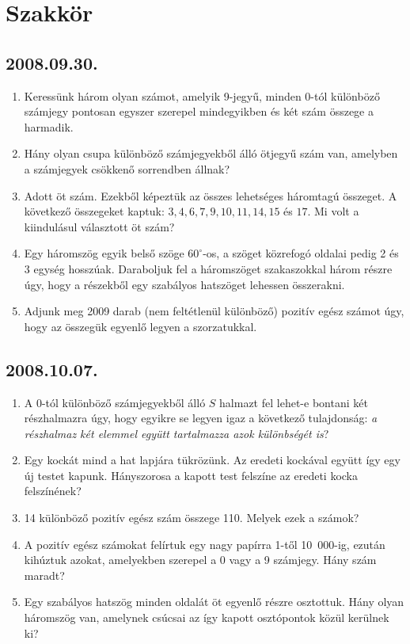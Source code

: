 \section{Szakkör}

\subsection*{2008.09.30.}
\begin{enumerate}
\item Keressünk három olyan számot, amelyik 9-jegyű, minden 0-tól különböző számjegy pontosan egyszer szerepel mindegyikben és két szám összege a harmadik.
\item Hány olyan csupa különböző számjegyekből álló ötjegyű szám van, amelyben a 
számjegyek csökkenő sorrendben állnak?
\item Adott öt szám. Ezekből képeztük az összes lehetséges háromtagú összeget. 
A következő összegeket kaptuk: $3,4,6,7,9,10,11,14,15$ és $17$. Mi volt a kiindulásul választott öt szám?
\item Egy háromszög egyik belső szöge $60^\circ$-os, a szöget közrefogó oldalai pedig 2 és 3 egység hosszúak. Daraboljuk fel a háromszöget szakaszokkal három részre úgy, hogy a részekből egy szabályos hatszöget lehessen össze\-rakni.
\item Adjunk meg 2009 darab (nem feltétlenül különböző) pozitív egész számot úgy, 
hogy az összegük egyenlő legyen a szorzatukkal. 
\end{enumerate}

\subsection*{2008.10.07.}
\begin{enumerate}
\item A 0-tól különböző számjegyekből álló $S$ halmazt fel lehet-e bontani két részhalmazra úgy, hogy egyikre se legyen igaz a következő tulajdonság:
\textit{a részhalmaz két elemmel együtt tartalmazza azok különbségét is}?
\item Egy kockát mind a hat lapjára tükrözünk. Az eredeti kockával együtt így egy új testet kapunk. Hányszorosa a kapott test felszíne az eredeti kocka felszínének?
\item 14 különböző pozitív egész szám összege 110. Melyek ezek a számok?
\item A pozitív egész számokat felírtuk egy nagy papírra 1-től 10~000-ig, ezután kihúztuk azokat, amelyekben szerepel a 0 vagy a 9 számjegy. Hány szám maradt?
\item Egy szabályos hatszög minden oldalát öt egyenlő részre osztottuk. Hány olyan 
háromszög van, amelynek csúcsai az így kapott osztópontok közül kerülnek ki?
\end{enumerate}

